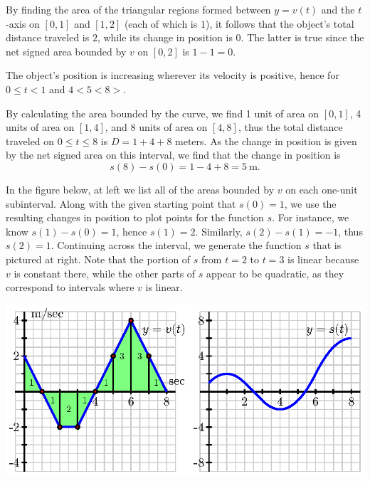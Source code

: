 \begin{activitySolution}
\ba
	\item By finding the area of the triangular regions formed between $y = v(t)$ and the $t$-axis on $[0,1]$ and $[1,2]$ (each of which is $1$), it follows that the object's total distance traveled is $2$, while its change in position is $0$.  The latter is true since the net signed area bounded by $v$ on $[0,2]$ is $1 - 1 = 0$.
	\item The object's position is increasing wherever its velocity is positive, hence for $0 \le t < 1$ and $4 < 5 < 8>$.
	\item By calculating the area bounded by the curve, we find 1 unit of area on $[0,1]$, 4 units of area on $[1,4]$, and 8 units of area on $[4,8]$, thus the total distance traveled on $0 \le t \le 8$ is $D = 1 + 4 + 8$ meters.  As the change in position is given by the net signed area on this interval, we find that the change in position is
	$$s(8) - s(0) = 1 - 4 + 8 = 5 \ \mbox{m}.$$
	\item In the figure below, at left we list all of the areas bounded by $v$ on each one-unit subinterval.  Along with the given starting point that $s(0) = 1$, we use the resulting changes in position to plot points for the function $s$.  For instance, we know $s(1) - s(0) = 1$, hence $s(1) = 2$.  Similarly, $s(2) - s(1) = -1$, thus $s(2) = 1$.  Continuing across the interval, we generate the function $s$ that is pictured at right.  Note that the portion of $s$ from $t = 2$ to $t = 3$ is linear because $v$ is constant there, while the other parts of $s$ appear to be quadratic, as they correspond to intervals where $v$ is linear.
\ea
\begin{center}
\includegraphics{figures/4_1_Act3Soln.eps}
\end{center}
\end{activitySolution}
\aftera





